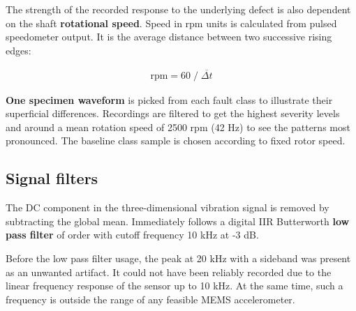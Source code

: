 The strength of the recorded response to the underlying defect is also dependent on the shaft \textbf{rotational speed}. Speed in rpm units is calculated from pulsed speedometer output. It is the average distance between two successive rising edges: 
\begin{ceqn}\begin{align}
\mathrm{rpm} = 60 \;/\; \overline{\Delta t}
\end{align}\end{ceqn}

\textbf{One specimen waveform} is picked from each fault class to illustrate their superficial differences. Recordings are filtered to get the highest severity levels and around a mean rotation speed of 2500 rpm (42 Hz) to see the patterns most pronounced. The baseline class sample is chosen according to fixed rotor speed.

\subsection{Signal filters}
The DC component in the three-dimensional vibration signal is removed by subtracting the global mean. Immediately follows a digital IIR Butterworth \textbf{low pass filter} of  order with cutoff frequency 10 kHz at -3 dB. 

Before the low pass filter usage, the peak at 20 kHz with a sideband was present as an unwanted artifact. It could not have been reliably recorded due to the linear frequency response of the sensor up to 10 kHz. At the same time, such a frequency is outside the range of any feasible MEMS accelerometer.

